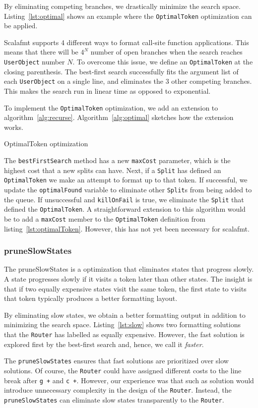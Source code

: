By eliminating competing branches, we drastically minimize the search space.
Listing~\ref{lst:optimal} shows an example where the \texttt{OptimalToken} optimization can be applied.

Scalafmt supports 4 different ways to format call-site function applications.
This means that there will be $4^N$ number of open branches when the search reaches \texttt{UserObject} number $N$.
To overcome this issue, we define an \texttt{OptimalToken} at the closing parenthesis.
The best-first search successfully fits the argument list of each \texttt{UserObject} on a single line, and eliminates the 3 other competing branches.
This makes the search run in linear time as opposed to exponential.

To implement the \texttt{OptimalToken} optimization, we add an extension to algorithm~\ref{alg:recurse}.
Algorithm~\ref{alg:optimal} sketches how the extension works.
\begin{algorithm}
  \caption{OptimalToken optimization}\label{alg:optimal}
  
\end{algorithm}
The \texttt{bestFirstSearch} method has a new \texttt{maxCost} parameter, which is the highest cost that a new splits can have.
Next, if a \texttt{Split} has defined an \texttt{OptimalToken} we make an attempt to format up to that token.
If successful, we update the \texttt{optimalFound} variable to eliminate other \texttt{Split}s from being added to the queue.
If unsuccessful and \texttt{killOnFail} is true, we eliminate the \texttt{Split} that defined the \texttt{OptimalToken}.
A straightforward extension to this algorithm would be to add a \texttt{maxCost} member to the \texttt{OptimalToken} definition from listing~\ref{lst:optimalToken}.
However, this has not yet been necessary for scalafmt.

\subsubsection{pruneSlowStates}
The pruneSlowStates is a optimization that eliminates states that progress slowly.
A state progresses slowly if it visits a token later than other states.
The insight is that if two equally expensive states visit the same token, the first state to visits that token typically produces a better formatting layout.

By eliminating slow states, we obtain a better formatting output in addition to minimizing the search space.
Listing~\ref{lst:slow} shows two formatting solutions that the \texttt{Router} has labelled as equally expensive.
However, the fast solution is explored first by the best-first search and, hence, we call it \emph{faster}.

The \texttt{pruneSlowStates} ensures that fast solutions are prioritized over slow solutions.
Of course, the \texttt{Router} could have assigned different costs to the line break after \texttt{g +} and \texttt{c +}.
However, our experience was that such as solution would introduce unnecessary complexity in the design of the \texttt{Router}.
Instead, the \texttt{pruneSlowStates} can eliminate slow states transparently to the \texttt{Router}.

